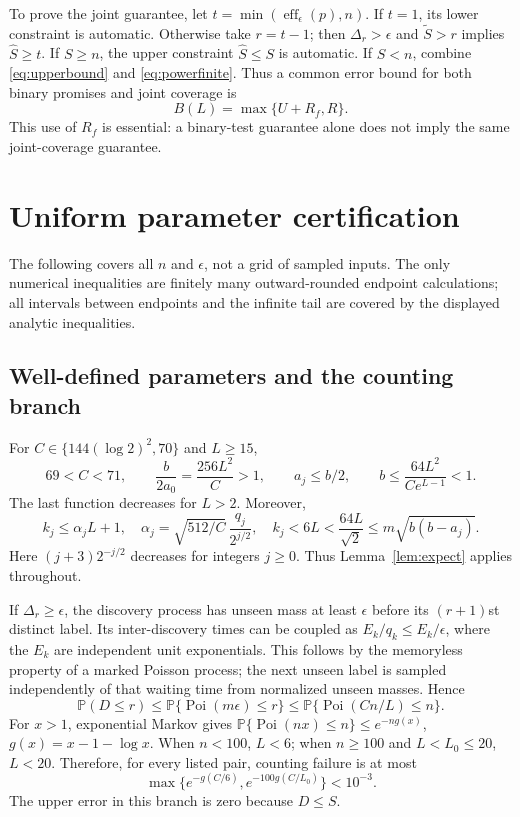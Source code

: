 \documentclass[10pt]{article}
\newcommand{\Prb}{\mathbb P}
\newcommand{\Poi}{\operatorname{Poi}}
\newcommand{\eff}{\operatorname{eff}}
\begin{document}
To prove the joint guarantee, let $t=\min(\eff_\epsilon(p),n)$.
If $t=1$, its lower constraint is automatic. Otherwise take $r=t-1$;
then $\Delta_r>\epsilon$ and $\widetilde S>r$ implies $\widehat S\ge t$.
If $S\ge n$, the upper constraint $\widehat S\le S$ is automatic.
If $S<n$, combine \eqref{eq:upperbound} and \eqref{eq:powerfinite}.
Thus a common error bound for both binary promises and joint coverage is
\begin{equation}\label{eq:common}
 B(L)=\max\{U+R_f,R\}.
\end{equation}
This use of $R_f$ is essential: a binary-test guarantee alone does not imply
the same joint-coverage guarantee.

\section{Uniform parameter certification}
The following covers all $n$ and $\epsilon$, not a grid of sampled inputs.
The only numerical inequalities are finitely many outward-rounded endpoint
calculations; all intervals between endpoints and the infinite tail are
covered by the displayed analytic inequalities.

\subsection{Well-defined parameters and the counting branch}
For $C\in\{144(\log2)^2,70\}$ and $L\ge15$,
\[
 69<C<71,\qquad \frac b{2a_0}=\frac{256L^2}{C}>1,\qquad
 a_j\le b/2,\qquad b\le\frac{64L^2}{Ce^{L-1}}<1.
\]
The last function decreases for $L>2$. Moreover,
\[
 k_j\le\alpha_j L+1,\quad
 \alpha_j=\sqrt{512/C}\,\frac{q_j}{2^{j/2}},\quad
 k_j<6L<\frac{64L}{\sqrt2}\le m\sqrt{b(b-a_j)}.
\]
Here $(j+3)2^{-j/2}$ decreases for integers $j\ge0$.
Thus Lemma~\ref{lem:expect} applies throughout.

If $\Delta_r\ge\epsilon$, the discovery process has unseen mass at least
$\epsilon$ before its $(r+1)$st distinct label. Its inter-discovery times
can be coupled as $E_k/q_k\le E_k/\epsilon$, where the $E_k$ are independent
unit exponentials. This follows by the memoryless property of a marked
Poisson process; the next unseen label is sampled independently of that
waiting time from normalized unseen masses. Hence
\[
 \Prb(D\le r)\le\Prb\{\Poi(m\epsilon)\le r\}
 \le\Prb\{\Poi(Cn/L)\le n\}.
\]
For $x>1$, exponential Markov gives
$\Prb\{\Poi(nx)\le n\}\le e^{-ng(x)}$, $g(x)=x-1-\log x$.
When $n<100$, $L<6$; when $n\ge100$ and $L<L_0\le20$, $L<20$.
Therefore, for every listed pair, counting failure is at most
\begin{equation}\label{eq:countcert}
 \max\{e^{-g(C/6)},e^{-100g(C/L_0)}\}<10^{-3}.
\end{equation}
The upper error in this branch is zero because $D\le S$.
\end{document}
